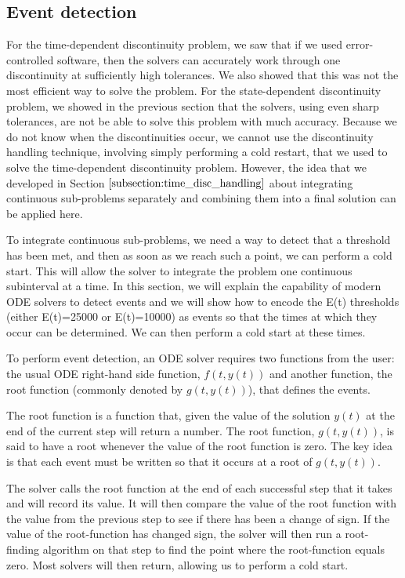 \subsection{Event detection}
\label{subsection:intro_event_detection}
For the time-dependent discontinuity problem, we saw that if we used error-controlled software, then the solvers can accurately work through one discontinuity at sufficiently high tolerances. We also showed that this was not the most efficient way to solve the problem. For the state-dependent discontinuity problem, we showed in the previous section that the solvers, using even sharp tolerances, are not be able to solve this problem with much accuracy. Because we do not know when the discontinuities occur, we cannot use the discontinuity handling technique, involving simply performing a cold restart, that we used to solve the time-dependent discontinuity problem. However, the idea that we developed in Section $\ref{subsection:time_disc_handling}$ about integrating continuous sub-problems separately and combining them into a final solution can be applied here. 

To integrate continuous sub-problems, we need a way to detect that a threshold has been met, and then as soon as we reach such a point, we can perform a cold start. This will allow the solver to integrate the problem one continuous subinterval at a time. In this section, we will explain the capability of modern ODE solvers to detect events and we will show how to encode the E(t) thresholds (either E(t)=25000 or E(t)=10000) as events so that the times at which they occur can be determined. We can then perform a cold start at these times.

To perform event detection, an ODE solver requires two functions from the user: the usual ODE right-hand side function, $f(t, y(t))$ and another function, the root function (commonly denoted by $g(t, y(t))$), that defines the events.

The root function is a function that, given the value of the solution $y(t)$ at the end of the current step will return a number. The root function, $g(t, y(t))$, is said to have a root whenever the value of the root function is zero. The key idea is that each event must be written so that it occurs at a root of $g(t, y(t))$.

The solver calls the root function at the end of each successful step that it takes and will record its value. It will then compare the value of the root function with the value from the previous step to see if there has been a change of sign. If the value of the root-function has changed sign, the solver will then run a root-finding algorithm on that step to find the point where the root-function equals zero. Most solvers will then return, allowing us to perform a cold start.

